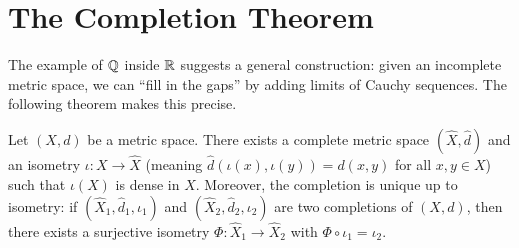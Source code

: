 \documentclass[11pt,a4paper]{article}
\begin{document}

\section{The Completion Theorem}
\label{sec:completion}

The example of $\mathbb{Q}$ inside $\mathbb{R}$ suggests a general construction: given an
incomplete metric space, we can ``fill in the gaps'' by adding limits of Cauchy
sequences. The following theorem makes this precise.

\begin{theorem}
\label{thm:completion}
Let $(X,d)$ be a metric space. There exists a complete metric space
$(\hat{X}, \hat{d})$ and an isometry $\iota \colon X \to \hat{X}$ (meaning
$\hat{d}(\iota(x), \iota(y)) = d(x,y)$ for all $x, y \in X$) such that
$\iota(X)$ is dense in $\hat{X}$. Moreover, the completion is unique up to
isometry: if $(\hat{X}_1, \hat{d}_1, \iota_1)$ and
$(\hat{X}_2, \hat{d}_2, \iota_2)$ are two completions of $(X,d)$, then there
exists a surjective isometry $\Phi \colon \hat{X}_1 \to \hat{X}_2$ with
$\Phi \circ \iota_1 = \iota_2$.
\end{theorem}
\end{document}
